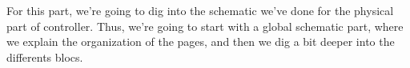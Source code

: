 For this part, we're going to dig into the schematic we've done for the physical part of 
controller.
Thus, we're going to start with a global schematic part, where we explain the organization 
of the pages, and then we dig a bit deeper into the differents blocs.







